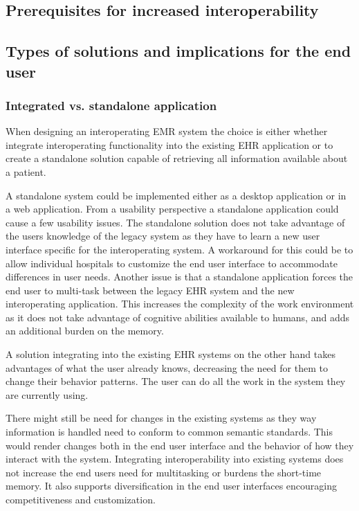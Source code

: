 \documentclass[14pt]{article}
\begin{document}
\subsection{Prerequisites for increased interoperability}

\subsection{Types of solutions and implications for the end user}

\subsubsection{Integrated vs. standalone application}
When designing an interoperating EMR system the choice is either whether integrate interoperating functionality into the existing EHR application or to create a standalone solution capable of retrieving all information available about a patient.

A standalone system could be implemented either as a desktop application or in a web application. From a usability perspective a standalone application could cause a few usability issues. The standalone solution does not take advantage of the users knowledge of the legacy system as they have to learn a new user interface specific for the interoperating system. A workaround for this could be to allow individual hospitals to customize the end user interface to accommodate differences in user needs. 
Another issue is that a standalone application forces the end user to multi-task between the legacy \gls{EHR} system and the new interoperating application. This increases the complexity of the work environment as it does not take advantage of cognitive abilities available to humans, and adds an additional burden on the memory. 

A solution integrating into the existing \gls{EHR} systems on the other hand takes advantages of what the user already knows, decreasing the need for them to change their behavior patterns. The user can do all the work in the system they are currently using.

There might still be need for changes in the existing systems as they way information is handled need to conform to common semantic standards. This would render changes both in the end user interface and the behavior of how they interact with the system. Integrating interoperability into existing systems does not increase the end users need for multitasking or burdens the short-time memory. It also supports diversification in the end user interfaces encouraging competitiveness and customization.
\end{document}
